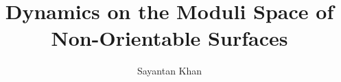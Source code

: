 \newtheorem{proposition}[theorem]{Proposition}
\newtheorem{conjecture}[theorem]{Conjecture}
\newtheorem{goal}[theorem]{Goal}





\newcommand{\pmf}{\mathbb{P}\mathcal{MF}}
\newcommand{\mf}{\mathcal{MF}}
\newcommand{\mcg}{\text{MCG}}
\newcommand{\os}{\mathcal{S}}
\newcommand{\no}{\mathcal{N}}
\newcommand{\teich}{\mathcal{T}}
\newcommand{\mg}{\mathcal{M}}
\newcommand{\pslr}{\text{PSL}(2, \mathbb{R})}
\newcommand{\scc}{\mathscr{S}}
\newcommand{\QQ}{\mathbb{Q}}
\newcommand{\ZZ}{\mathbb{Z}}
\newcommand{\wt}{\widetilde}
\newcommand{\cA}{\mathcal{A}}
\newcommand{\cR}{\mathcal{R}}
\newcommand{\dynlim}{\Lambda_{\text{dyn}}}
\newcommand{\geolim}{\Lambda_{\text{geo}}}
\newcommand{\HH}{\mathbb{H}^2}
\newcommand{\RR}{\mathbb{R}}
\newcommand{\expansion}{\text{Sat}}
\newcommand{\err}[1]{\text{err}_{#1}}
\newcommand{\norm}[1]{\left\lVert#1\right\rVert}
\newcommand{\dd}{\text{\,d}}
\newcommand{\lhyp}{\ell_{\text{hyp}}}
\newcommand{\lflat}{\ell_{\text{flat}}}
\renewcommand{\qedsymbol}{}


\newcommand\Narrower[2][3em]{%
\makebox[\linewidth][c]{%
  \begin{minipage}{\dimexpr\textwidth-#1\relax}
  \raggedright#2
  \end{minipage}%
  }%
}

\def\signed #1{{\leavevmode\unskip\nobreak\hfil\penalty50\hskip2em
  \hbox{}\nobreak\hfil(#1)%
  \parfillskip=0pt \finalhyphendemerits=0 \endgraf}}

\newsavebox\mybox
\newenvironment{aquote}[1]
  {\savebox\mybox{#1}\begin{quote}}
  {\signed{\usebox\mybox}\end{quote}}



\title{Dynamics on the Moduli Space of Non-Orientable Surfaces}
\author[Sayantan Khan]{Sayantan Khan}

